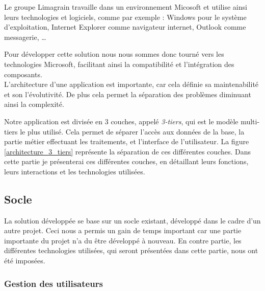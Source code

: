 Le groupe Limagrain travaille dans un environnement Micosoft et utilise ainsi leurs technologies et logiciels, comme par exemple : Windows pour le système d'exploitation, Internet Explorer comme navigateur internet, Outlook comme messagerie, \ldots

Pour développer cette solution nous nous sommes donc tourné vers les technologies Microsoft, facilitant ainsi la compatibilité et l'intégration des composants.
\\

L'architecture d'une application est importante, car cela définie sa maintenabilité et son l'évolutivité. De plus cela permet la séparation des problèmes diminuant ainsi la complexité.

Notre application est divisée en 3 couches, appelé \textit{3-tiers}, qui est le modèle multi-tiers le plus utilisé. Cela permet de séparer l'accès aux données de la base, la partie métier effectuant les traitements, et l'interface de l'utilisateur. La figure \ref{architecture_3_tiers} représente la séparation de ces différentes couches. Dans cette partie je présenterai ces différentes couches, en détaillant leurs fonctions, leurs interactions et les technologies utilisées.


\subsection{Socle}

La solution développée se base sur un socle existant, développé dans le cadre d'un autre projet. Ceci nous a permis un gain de temps important car une partie importante du projet n'a du être développé à nouveau. En contre partie, les différentes technologies utilisées, qui seront présentées dans cette partie, nous ont été imposées.


\subsubsection{Gestion des utilisateurs}

